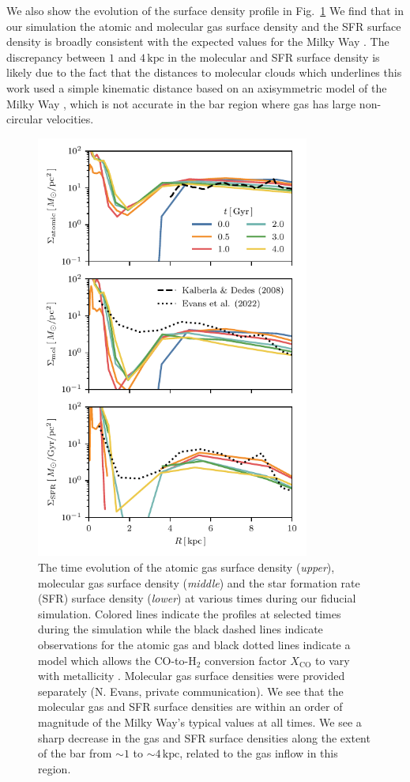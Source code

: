 \documentclass[fleqn,usenatbib]{mnras}
\begin{document}
We also show the evolution of the surface density profile in Fig.~\ref{fig:surf}
We find that in our simulation the atomic and molecular gas surface density and
the SFR surface density is broadly consistent with the expected values for the
Milky Way \citep{2008AA...487..951K,2022ApJ...929L..18E}. The discrepancy between
$1$ and $4\,\textrm{kpc}$ in the molecular and SFR surface density is likely due
to the fact that the distances to molecular clouds which underlines this work
used a simple kinematic distance based on an axisymmetric model of the Milky
Way \citep{2017ApJ...834...57M}, which is not accurate in the bar region where gas
has large non-circular velocities.

\begin{figure}
    \centering
    \includegraphics[width=9cm]{fig/surf_dens.pdf}
    \caption{The time evolution of the atomic gas surface density
    (\textit{upper}), molecular gas surface density (\textit{middle}) and the
    star formation rate (SFR) surface density (\textit{lower}) at various times
    during our fiducial simulation. Colored lines indicate the profiles at
    selected times during the simulation while the black dashed lines indicate
    observations for the atomic gas \citep{2008AA...487..951K} and black dotted
    lines indicate a model which allows the CO-to-H$_2$ conversion factor
    $X_{\textrm{CO}}$ to vary with metallicity \citep{2022ApJ...929L..18E}.
    Molecular gas surface densities were provided separately (N. Evans, private
    communication). We see that the molecular gas and SFR surface densities are
    within an order of magnitude of the Milky Way's typical values at all times.
    We see a sharp decrease in the gas and SFR surface densities along the
    extent of the bar from $\sim1$ to $\sim4\,\textrm{kpc}$, related to the gas
    inflow in this region.}
    \label{fig:surf}
\end{figure}
\end{document}
